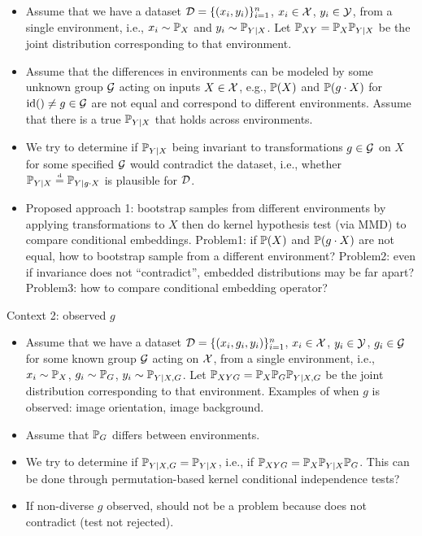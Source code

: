 \begin{itemize}

\item
Assume that we have a dataset $\mathcal{D}=\{(x_i,y_i)\}_{i=1}^n$, $x_i\in\mathcal{X}$, $y_i\in\mathcal{Y}$, from a single environment, i.e., $x_i\sim\mathbb{P}_X$ and $y_i\sim\mathbb{P}_{Y|X}$. Let $\mathbb{P}_{XY}=\mathbb{P}_X\mathbb{P}_{Y|X}$ be the joint distribution corresponding to that environment.

\item
Assume that the differences in environments can be modeled by some unknown group $\mathcal{G}$ acting on inputs $X\in\mathcal{X}$, e.g., $\mathbb{P}(X)$ and $\mathbb{P}(g\cdot X)$ for $\mathrm{id}()\neq g\in\mathcal{G}$ are not equal and correspond to different environments. Assume that there is a true $\mathbb{P}_{Y|X}$ that holds across environments.

\item
We try to determine if $\mathbb{P}_{Y|X}$ being invariant to transformations $g\in\mathcal{G}$ on $X$ for some specified $\mathcal{G}$ would contradict the dataset, i.e., whether $\mathbb{P}_{Y|X}\stackrel{\text{\rm\tiny d}}{=}\mathbb{P}_{Y|g\cdot X}$ is plausible for $\mathcal{D}$.

\item
Proposed approach 1: bootstrap samples from different environments by applying transformations to $X$ then do kernel hypothesis test (via MMD) to compare conditional embeddings. \todo Problem1: if  $\mathbb{P}(X)$ and $\mathbb{P}(g\cdot X)$ are not equal, how to bootstrap sample from a different environment? \todo Problem2: even if invariance does not ``contradict'', embedded distributions may be far apart? \todo Problem3: how to compare conditional embedding operator?

\end{itemize}

Context 2: observed $g$

\begin{itemize}

\item
Assume that we have a dataset $\mathcal{D}=\{(x_i,g_i,y_i)\}_{i=1}^n$, $x_i\in\mathcal{X}$, $y_i\in\mathcal{Y}$, $g_i\in\mathcal{G}$ for some known group $\mathcal{G}$ acting on $\mathcal{X}$, from a single environment, i.e., $x_i\sim\mathbb{P}_X$, $g_i\sim\mathbb{P}_G$, $y_i\sim\mathbb{P}_{Y|X,G}$. Let $\mathbb{P}_{XYG}=\mathbb{P}_X\mathbb{P}_G\mathbb{P}_{Y|X,G}$ be the joint distribution corresponding to that environment. Examples of when $g$ is observed: image orientation, image background.

\item
Assume that $\mathbb{P}_G$ differs between environments.

\item
We try to determine if $\mathbb{P}_{Y|X,G}=\mathbb{P}_{Y|X}$, i.e., if $\mathbb{P}_{XYG}=\mathbb{P}_X\mathbb{P}_{Y|X}\mathbb{P}_G$. \todo This can be done through permutation-based kernel conditional independence tests?

\item
\todo If non-diverse $g$ observed, should not be a problem because does not contradict (test not rejected).

\end{itemize}

